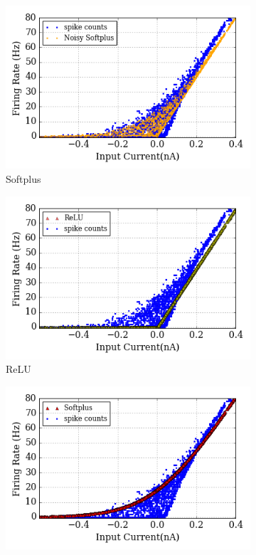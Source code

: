 \documentclass{article}
\begin{document}
	\begin{figure}[hb!]
		\centering
		\begin{subfigure}[hb]{0.32\textwidth}
			\includegraphics[width=\textwidth]{pics_iconip/6-5-3.png}
			\caption{Softplus}
		\end{subfigure}
		\begin{subfigure}[hb]{0.32\textwidth}
			\includegraphics[width=\textwidth]{pics_iconip/6-5-2.png}
			\caption{ReLU}
		\end{subfigure}
		\begin{subfigure}[hb]{0.32\textwidth}
			\includegraphics[width=\textwidth]{pics_iconip/6-5-1.png}

\end{subfigure}
\end{figure}
\end{document}
